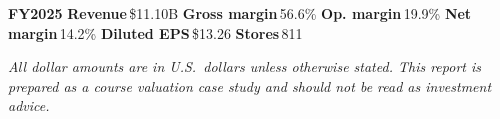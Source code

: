 \documentclass[a4paper]{CSMakotoTechnicalReport}
\newcommand{\kpi}[2]{\textbf{#1}\,{\footnotesize #2}}
\newcommand{\kpidot}{\;\textcolor{NavyAccent}{\footnotesize\textbullet}\;}
\begin{document}
\noindent\colorbox{KpiBg}{\parbox{\dimexpr\linewidth-2\fboxsep\relax}{\vspace{2pt}\centering
	{\footnotesize\color{NavyAccent2}\textbf{FY2025}}\kpidot
	\kpi{Revenue}{\$11.10B}\kpidot
	\kpi{Gross margin}{56.6\%}\kpidot
	\kpi{Op. margin}{19.9\%}\kpidot
	\kpi{Net margin}{14.2\%}\kpidot
	\kpi{Diluted EPS}{\$13.26}\kpidot
	\kpi{Stores}{811}
	\vspace{3pt}}}\par
\vspace{12pt}

{\large\raggedright\reportauthors\par}
\vspace{6pt}
{\footnotesize\raggedright\textit{All dollar amounts are in U.S.\ dollars unless otherwise stated. This report is prepared as a course valuation case study and should not be read as investment advice.}~\textbar~\reportdate\par}

\vspace{0.03\textheight}
\end{document}
